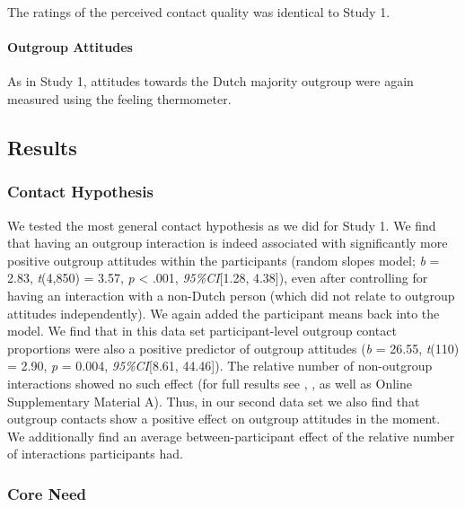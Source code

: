 The ratings of the perceived contact quality was identical to Study 1.

\paragraph{Outgroup Attitudes}

As in Study 1, attitudes towards the Dutch majority outgroup were again
measured using the feeling thermometer.

\subsection{Results}

\subsubsection{Contact Hypothesis}

We tested the most general contact hypothesis as we did for Study 1. We
find that having an outgroup interaction is indeed associated with
significantly more positive outgroup attitudes within the participants
(random slopes model; \textit{b} = 2.83, \textit{t}(4,850) = 3.57,
\textit{p} \textless{} .001, \textit{95\%CI}{[}1.28, 4.38{]}), even
after controlling for having an interaction with a non-Dutch person
(which did not relate to outgroup attitudes independently). We again
added the participant means back into the model. We find that in this
data set participant-level outgroup contact proportions were also a
positive predictor of outgroup attitudes (\textit{b} = 26.55,
\textit{t}(110) = 2.90, \textit{p} = 0.004, \textit{95\%CI}{[}8.61,
44.46{]}). The relative number of non-outgroup interactions showed no
such effect (for full results see ,
, as well as Online Supplementary Material
A). Thus, in our second data set we also find that outgroup contacts
show a positive effect on outgroup attitudes in the moment. We
additionally find an average between-participant effect of the relative
number of interactions participants had.

\subsubsection{Core Need}

